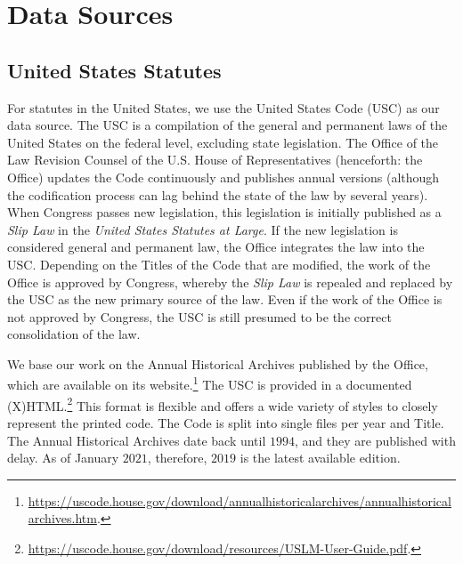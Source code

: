 \documentclass[utf8,sort&compress,numbers,square,table,hidelinks]{frontiers_suppmat} %
\begin{document}
\onecolumn
{}

\title[Supplementary Information]{{}}

\maketitle

\vspace*{6pt}
\section{Data Sources}
\label{sec:data}

\vspace*{6pt}
\subsection{United States Statutes}

For statutes in the United States, 
we use the United States Code (USC) as our data source. 
The USC is a compilation of the general and permanent laws of the United States on the federal level, excluding state legislation.
The Office of the Law Revision Counsel of the U.S. House of Representatives (henceforth: the Office) updates the Code continuously and publishes annual versions (although the codification process can lag behind the state of the law by several years). 
When Congress passes new legislation, 
this legislation is initially published as a \emph{Slip Law} in the \emph{United States Statutes at Large}. 
If the new legislation is considered general and permanent law, the Office integrates the law into the USC.
Depending on the Titles of the Code that are modified, 
the work of the Office is approved by Congress, 
whereby the \emph{Slip Law} is repealed and replaced by the USC as the new primary source of the law. 
Even if the work of the Office is not approved by Congress, the USC is still presumed to be the correct consolidation of the law.

We base our work on the Annual Historical Archives published by the Office, 
which are available on its website.\footnote{\url{https://uscode.house.gov/download/annualhistoricalarchives/annualhistoricalarchives.htm}.}
The USC is provided in a documented (X)HTML.\footnote{\url{https://uscode.house.gov/download/resources/USLM-User-Guide.pdf}.} 
This format is flexible and offers a wide variety of styles to closely represent the printed code. 
The Code is split into single files per year and Title.
The Annual Historical Archives date back until $1994$, 
and they are published with delay. 
As of January $2021$, therefore, $2019$ is the latest available edition.
\end{document}
